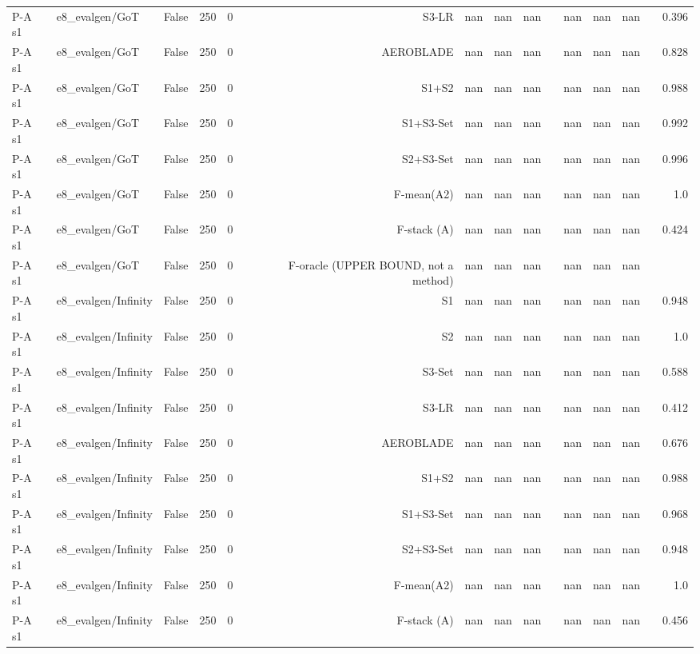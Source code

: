 \begin{table}[htbp]
\begin{tabular}{llrrrrrrrrrrrrr}
P-A s1 & e8\_evalgen/GoT & False & 250 & 0 & S3-LR & nan & nan & nan &  & nan & nan & nan &  & 0.396 \\
P-A s1 & e8\_evalgen/GoT & False & 250 & 0 & AEROBLADE & nan & nan & nan &  & nan & nan & nan &  & 0.828 \\
P-A s1 & e8\_evalgen/GoT & False & 250 & 0 & S1+S2 & nan & nan & nan &  & nan & nan & nan &  & 0.988 \\
P-A s1 & e8\_evalgen/GoT & False & 250 & 0 & S1+S3-Set & nan & nan & nan &  & nan & nan & nan &  & 0.992 \\
P-A s1 & e8\_evalgen/GoT & False & 250 & 0 & S2+S3-Set & nan & nan & nan &  & nan & nan & nan &  & 0.996 \\
P-A s1 & e8\_evalgen/GoT & False & 250 & 0 & F-mean(A2) & nan & nan & nan &  & nan & nan & nan &  & 1.0 \\
P-A s1 & e8\_evalgen/GoT & False & 250 & 0 & F-stack (A) & nan & nan & nan &  & nan & nan & nan &  & 0.424 \\
P-A s1 & e8\_evalgen/GoT & False & 250 & 0 & F-oracle (UPPER BOUND, not a method) & nan & nan & nan &  & nan & nan & nan &  &  \\
P-A s1 & e8\_evalgen/Infinity & False & 250 & 0 & S1 & nan & nan & nan &  & nan & nan & nan &  & 0.948 \\
P-A s1 & e8\_evalgen/Infinity & False & 250 & 0 & S2 & nan & nan & nan &  & nan & nan & nan &  & 1.0 \\
P-A s1 & e8\_evalgen/Infinity & False & 250 & 0 & S3-Set & nan & nan & nan &  & nan & nan & nan &  & 0.588 \\
P-A s1 & e8\_evalgen/Infinity & False & 250 & 0 & S3-LR & nan & nan & nan &  & nan & nan & nan &  & 0.412 \\
P-A s1 & e8\_evalgen/Infinity & False & 250 & 0 & AEROBLADE & nan & nan & nan &  & nan & nan & nan &  & 0.676 \\
P-A s1 & e8\_evalgen/Infinity & False & 250 & 0 & S1+S2 & nan & nan & nan &  & nan & nan & nan &  & 0.988 \\
P-A s1 & e8\_evalgen/Infinity & False & 250 & 0 & S1+S3-Set & nan & nan & nan &  & nan & nan & nan &  & 0.968 \\
P-A s1 & e8\_evalgen/Infinity & False & 250 & 0 & S2+S3-Set & nan & nan & nan &  & nan & nan & nan &  & 0.948 \\
P-A s1 & e8\_evalgen/Infinity & False & 250 & 0 & F-mean(A2) & nan & nan & nan &  & nan & nan & nan &  & 1.0 \\
P-A s1 & e8\_evalgen/Infinity & False & 250 & 0 & F-stack (A) & nan & nan & nan &  & nan & nan & nan &  & 0.456 \\

\end{tabular}
\end{table}

